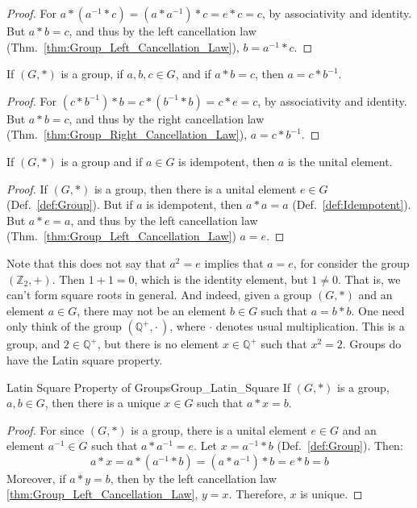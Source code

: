     \begin{proof}
        For $a*(a^{\minus{1}}*c)=(a*a^{\minus{1}})*c=e*c=c$, by associativity
        and identity. But $a*b=c$, and thus by the left cancellation law
        (Thm.~\ref{thm:Group_Left_Cancellation_Law}), $b=a^{\minus{1}}*c$.
    \end{proof}
    \begin{theorem}
        \label{thm:Group_Simplifying_on_Right}%
        If $(G,*)$ is a group, if $a,b,c\in{G}$, and if $a*b=c$, then
        $a=c*b^{\minus{1}}$.
    \end{theorem}
    \begin{proof}
        For $(c*b^{\minus{1}})*b=c*(b^{\minus{1}}*b)=c*e=c$, by associativity
        and identity. But $a*b=c$, and thus by the right cancellation law
        (Thm.~\ref{thm:Group_Right_Cancellation_Law}), $a=c*b^{\minus{1}}$.
    \end{proof}
    \begin{theorem}
        If $(G,*)$ is a group and if $a\in{G}$ is idempotent, then $a$ is the
        unital element.
    \end{theorem}
    \begin{proof}
        If $(G,*)$ is a group, then there is a unital element $e\in{G}$
        (Def.~\ref{def:Group}). But if $a$ is idempotent, then $a*a=a$
        (Def.~\ref{def:Idempotent}). But $a*e=a$, and thus by the left
        cancellation law (Thm.~\ref{thm:Group_Left_Cancellation_Law}) $a=e$.
    \end{proof}
    Note that this does not say that $a^{2}=e$ implies that $a=e$, for consider
    the group $(\mathbb{Z}_{2},+)$. Then $1+1=0$, which is the identity element,
    but $1\ne{0}$. That is, we can't form square roots in general. And indeed,
    given a group $(G,*)$ and an element $a\in{G}$, there may not be an element
    $b\in{G}$ such that $a=b*b$. One need only think of the group
    $(\mathbb{Q}^{+},\cdot\,)$, where $\cdot$ denotes usual multiplication.
    This is a group, and $2\in\mathbb{Q}^{+}$, but there is no element
    $x\in\mathbb{Q}^{+}$ such that $x^{2}=2$. Groups do have the Latin square
    property.
    \begin{ltheorem}{Latin Square Property of Groups}{Group_Latin_Square}
        If $(G,*)$ is a group, $a,b\in{G}$, then there is a unique $x\in{G}$
        such that $a*x=b$.
    \end{ltheorem}
    \begin{proof}
        For since $(G,*)$ is a group, there is a unital element $e\in{G}$ and an
        element $a^{\minus{1}}\in{G}$ such that $a*a^{\minus{1}}=e$.
        Let $x=a^{\minus{1}}*b$ (Def.~\ref{def:Group}). Then:
        \begin{equation}
            a*x=a*(a^{\minus{1}}*b)=(a*a^{\minus{1}})*b=e*b=b
        \end{equation}
        Moreover, if $a*y=b$, then by the left cancellation law
        \ref{thm:Group_Left_Cancellation_Law}, $y=x$. Therefore, $x$ is unique.
    \end{proof}
